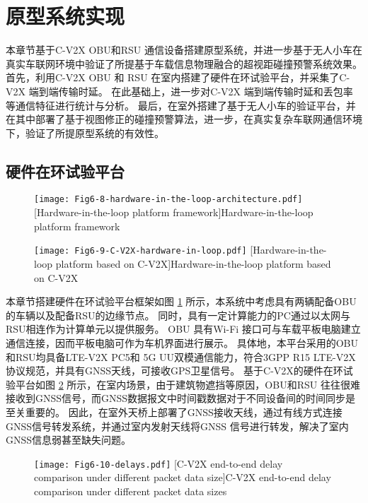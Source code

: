 \section{原型系统实现}\label{section 5-5}

本章节基于C-V2X OBU和RSU 通信设备搭建原型系统，并进一步基于无人小车在真实车联网环境中验证了所提基于车载信息物理融合的超视距碰撞预警系统效果。
首先，利用C-V2X OBU 和 RSU 在室内搭建了硬件在环试验平台，并采集了C-V2X 端到端传输时延。
在此基础上，进一步对C-V2X 端到端传输时延和丢包率等通信特征进行统计与分析。
最后，在室外搭建了基于无人小车的验证平台，并在其中部署了基于视图修正的碰撞预警算法，进一步，在真实复杂车联网通信环境下，验证了所提原型系统的有效性。

\subsection{硬件在环试验平台}

\begin{figure}[h]
\centering
  \texttt{[image: Fig6-8-hardware-in-the-loop-architecture.pdf]}
  [Hardware-in-the-loop platform framework]{Hardware-in-the-loop platform framework}
  \label{fig 5-8}
\end{figure}

\begin{figure}[h]
\centering
  \texttt{[image: Fig6-9-C-V2X-hardware-in-loop.pdf]}
  [Hardware-in-the-loop platform based on C-V2X]{Hardware-in-the-loop platform based on C-V2X}
  \label{fig 5-9}
\end{figure}

本章节搭建硬件在环试验平台框架如图 \ref{fig 5-8} 所示，本系统中考虑具有两辆配备OBU的车辆以及配备RSU的边缘节点。
同时，具有一定计算能力的PC通过以太网与RSU相连作为计算单元以提供服务。
OBU 具有Wi-Fi 接口可与车载平板电脑建立通信连接，因而平板电脑可作为车机界面进行展示。
具体地，本平台采用的OBU和RSU均具备LTE-V2X PC5和 5G UU双模通信能力，符合3GPP R15 LTE-V2X协议规范，并具有GNSS天线，可接收GPS卫星信号。
基于C-V2X的硬件在环试验平台如图 \ref{fig 5-9} 所示，在室内场景，由于建筑物遮挡等原因，OBU和RSU 往往很难接收到GNSS信号，而GNSS数据报文中时间戳数据对于不同设备间的时间同步是至关重要的。
因此，在室外天桥上部署了GNSS接收天线，通过有线方式连接GNSS信号转发系统，并通过室内发射天线将GNSS 信号进行转发，解决了室内GNSS信息弱甚至缺失问题。

\begin{figure}[h]
\centering
  \texttt{[image: Fig6-10-delays.pdf]}
  [C-V2X end-to-end delay comparison under different packet data size]{C-V2X end-to-end delay comparison under different packet data sizes}
  \label{fig 5-10}
\end{figure}

